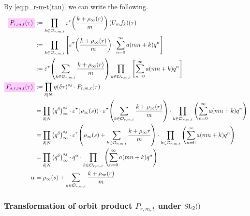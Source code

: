 \documentclass{article}
\begin{document}
By \eqref{eq:p_r-m-t(tau)} we can write the following.
\begin{align}
  \defineNotation[P-r-m-t]{P_{r, m, t}(\tau)}
  &:= \prod_{k \in \modularOrbit{r,m,t}}
    \unityPowerTau{\frac{k+\rho_\infty(r)}{m}} (U_mf_{k})(\tau)\\
  &:= \prod_{k \in \modularOrbit{r,m,t}}
    \left[\unityPowerTau{\frac{k+\rho_\infty(r)}{m}}
    \cdot \sum_{n=0}^\infty a(mn+k) q^n\right]
  \\
  &:=
    \unityPowerTau{\sum_{k\in\modularOrbit{r,m,t}}\frac{k+\rho_\infty(r)}{m}}
    \prod_{k \in \modularOrbit{r,m,t}} \left[\sum_{n=0}^\infty a(mn+k) q^n\right]
  \\
  \defineNotation[F-s-r-m-t]{F_{s, r, m, t}(\tau)}
  &:= \divisorprod{N} \eta(\delta\tau)^{s_\delta} \cdot P_{r,m,t}(\tau)
  \\
  &= \divisorprod{N} \eulerFunction{\delta}^{s_\delta}
    \cdot
    \unityPowerTau{\rho_\infty(s)}
    \cdot
    \unityPowerTau{\sum_{k\in\modularOrbit{r,m,t}}\frac{k+\rho_\infty(r)}{m}}
    \cdot
    \prod_{k \in \modularOrbit{r,m,t}} \left(\sum_{n=0}^\infty a(mn+k) q^n\right)
    \label{eq:F_s-r-m-t(tau)}
  \\
  &= \divisorprod{N} \eulerFunction{\delta}^{s_\delta}
    \cdot
    \unityPowerTau{
    \rho_\infty(s)
    +
    \sum_{k\in\modularOrbit{r,m,t}}\frac{k+\rho_\infty{r}}{m}
    }
    \cdot
    \prod_{k \in \modularOrbit{r,m,t}} \left(\sum_{n=0}^\infty a(mn+k) q^n\right)
  \\
  &= \divisorprod{N} \eulerFunction{\delta}^{s_\delta}
    \cdot
    q^\alpha
    \cdot
    \prod_{k \in \modularOrbit{r,m,t}} \left(\sum_{n=0}^\infty a(mn+k) q^n\right)
  \\
  \alpha
  &=
    \rho_\infty(s)
    +
    \sum_{k\in\modularOrbit{r,m,t}}\frac{k+\rho_\infty(r)}{m}
    \label{eq:alphaInfinity}
\end{align}

\subsubsection{Transformation of orbit product $P_{r,m,t}$ under $\SL2Z$}
\end{document}
